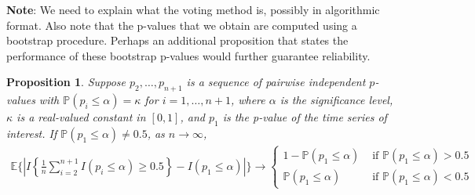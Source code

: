 \documentclass[11pt]{article}
\def\E{\mathbb{E}} %
\def\P{\mathbb{P}}
\newtheorem{prop}{Proposition}
\theoremstyle{definition}
\begin{document}
\noindent\textbf{Note}: We need to explain what the voting method is, possibly in algorithmic format. Also note that the p-values that we obtain are computed using a bootstrap procedure. Perhaps an additional proposition that states the performance of these bootstrap p-values would further guarantee reliability. 

\begin{prop}

\label{votprop}Suppose $p_2, \ldots, p_{n+1}$ is  a sequence of pairwise independent $p$-values  with $\P(p_i \leq \alpha)=\kappa$ for $i = 1, \ldots, n+1$, where $\alpha$ is the significance level, $\kappa$ is a real-valued constant in $[0,1]$, and  $p_1$ is the p-value of the time series of interest. If $\P(p_1 \leq \alpha) \neq 0.5$,  as $n\to \infty$, 
\begin{align*}
  \E \bigg\{\left|I\left\{\frac{1}{n}\sum_{i=2}^{n+1}I(p_i \leq  \alpha) \geq 0.5\right\}
  - I( p_1 \leq  \alpha) \right|\bigg\}
  \to  \begin{cases}
    1- \P(p_1 \leq \alpha) & \text{ if } \P(p_1 \leq \alpha) > 0.5 \\
    \P(p_1 \leq \alpha) & \text{ if } \P(p_1 \leq \alpha) < 0.5 
  \end{cases}
\end{align*}
\end{prop}
\end{document}
